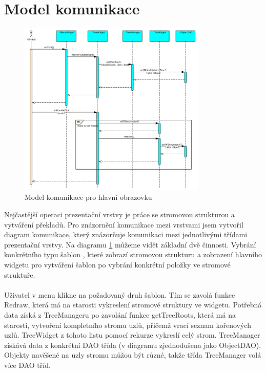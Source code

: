 \documentclass[thesis=B,czech]{resources/FITthesis}[2012/06/26]
\begin{document}
	\section{Model komunikace}
	\begin{figure}\centering
	\includegraphics[width=0.8\textwidth]{images/comunication_main}
	\caption[Model komunikace pro hlavní obrazovku]{Model komunikace pro hlavní obrazovku}\label{fig:comunication_main}
	\end{figure}
Nejčastější operaci prezentační vrstvy je práce se stromovou strukturou a vytváření překladů. Pro znázornění komunikace mezi vrstvami jsem vytvořil diagram komunikace, který znázorňuje komunikaci mezi jednotlivými třídami prezentační vrstvy. Na diagramu \ref{fig:comunication_main} můžeme vidět základní dvě činnosti. Vybrání konkrétního typu šablon , které zobrazí stromovou strukturu a zobrazení hlavního widgetu pro vytváření šablon po vybrání konkrétní položky ve stromové struktuře.\\
\\
Uživatel v menu klikne na požadovaný druh šablon. Tím se zavolá funkce Redraw, která má na starosti vykreslení stromové struktury ve widgetu. Potřebná data získá z TreeManageru po zavolání funkce getTreeRoots, která má na starosti, vytvoření kompletního stromu uzlů, přičemž vrací seznam kořenových uzlů. TreeWidget z tohoto listu pomocí rekurze vykreslí celý strom. TreeManager získává data z konkrétní DAO třída (v diagramu zjednodušena jako ObjectDAO). Objekty navěšené na uzly stromu můžou být různé, takže třída TreeManager volá více DAO tříd.\\
\\
\end{document}
